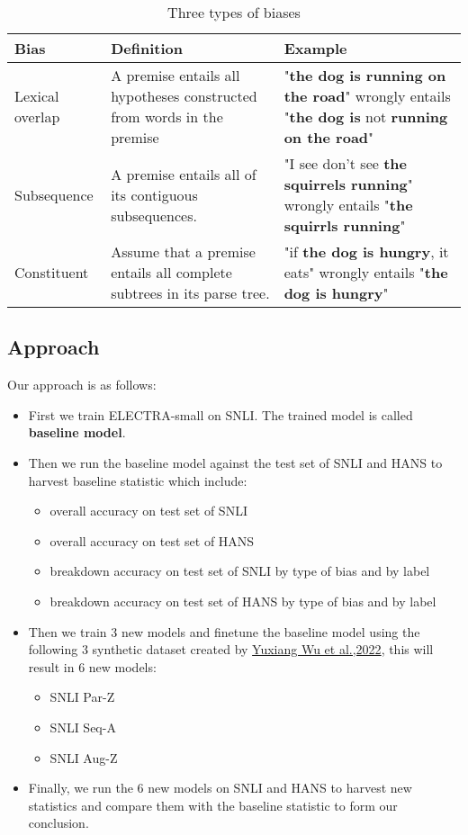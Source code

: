 \documentclass{article}
\begin{document}
\begin{table}[h]
    \label{table1}
    \caption{Three types of biases}
\centering
\begin{tabular}{p{3cm} p{5cm} p{5cm}}
\hline
\textbf{Bias}    & \textbf{Definition}    & \textbf{Example}    \\ \hline
Lexical overlap  & A premise entails all hypotheses
constructed from words in the premise  & "\textbf{the dog is running on the road}" wrongly entails "\textbf{the dog is} not \textbf{running on the road}"  \\
Subsequence  & A premise entails all of its contiguous subsequences.  & "I see don't see \textbf{the squirrels running}" wrongly entails "\textbf{the squirrls running}" \\
Constituent  & Assume that a premise entails all complete subtrees in its parse tree. & "if \textbf{the dog is hungry}, it eats" wrongly entails "\textbf{the dog is hungry}"  \\ \hline
\end{tabular}

\end{table}

\subsection{Approach}
Our approach is as follows:
\begin{itemize}
  \item First we train ELECTRA-small on SNLI. The trained model is called \textbf{baseline model}.
  \item Then we run the baseline model against the test set of SNLI and HANS to harvest baseline statistic which include:
    \begin{itemize}
      \item overall accuracy on test set of SNLI
      \item overall accuracy on test set of HANS
      \item breakdown accuracy on test set of SNLI by type of bias and by label
      \item breakdown accuracy on test set of HANS by type of bias and by label
    \end{itemize}
  \item Then we train 3 new models and finetune the baseline model using the following 3 synthetic dataset created by \hyperref[ref2]{Yuxiang Wu et al.,2022}, this will result in 6 new models:
    \begin{itemize}
      \item SNLI Par-Z
      \item SNLI Seq-A
      \item SNLI Aug-Z
    \end{itemize}
  \item Finally, we run the 6 new models on SNLI and HANS to harvest new statistics and compare them with the baseline statistic to form our conclusion.
\end{itemize}
\end{document}
